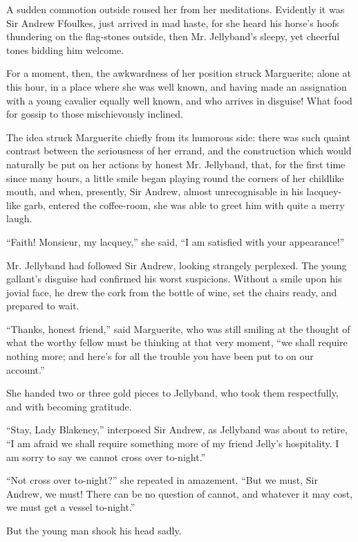 \documentclass[paper=a5,BCOR=7mm,twoside,DIV=calc,12pt,usegeometry,chapterprefix,endperiod,headings=big]{scrbook}
\begin{document}
A sudden commotion outside roused her from her meditations. Evidently it was Sir Andrew Ffoulkes, just arrived in mad haste, for she heard his horse's hoofs thundering on the flag-stones outside, then Mr. Jellyband's sleepy, yet cheerful tones bidding him welcome.

For a moment, then, the awkwardness of her position struck Marguerite; alone at this hour, in a place where she was well known, and having made an assignation with a young cavalier equally well known, and who arrives in disguise! What food for gossip to those mischievously inclined.

The idea struck Marguerite chiefly from its humorous side: there was such quaint contrast between the seriousness of her errand, and the construction which would naturally be put on her actions by honest Mr. Jellyband, that, for the first time since many hours, a little smile began playing round the corners of her childlike mouth, and when, presently, Sir Andrew, almost unrecognisable in his lacquey-like garb, entered the coffee-room, she was able to greet him with quite a merry laugh.

\enquote{Faith! Monsieur, my lacquey,} she said, \enquote{I am satisfied with your appearance!}

Mr. Jellyband had followed Sir Andrew, looking strangely perplexed. The young gallant's disguise had confirmed his worst suspicions. Without a smile upon his jovial face, he drew the cork from the bottle of wine, set the chairs ready, and prepared to wait.

\enquote{Thanks, honest friend,} said Marguerite, who was still smiling at the thought of what the worthy fellow must be thinking at that very moment, \enquote{we shall require nothing more; and here's for all the trouble you have been put to on our account.}

She handed two or three gold pieces to Jellyband, who took them respectfully, and with becoming gratitude.

\enquote{Stay, Lady Blakeney,} interposed Sir Andrew, as Jellyband was about to retire, \enquote{I am afraid we shall require something more of my friend Jelly's hospitality. I am sorry to say we cannot cross over to-night.}

\enquote{Not cross over to-night?} she repeated in amazement. \enquote{But we must, Sir Andrew, we must! There can be no question of cannot, and whatever it may cost, we must get a vessel to-night.}

But the young man shook his head sadly.
\end{document}
